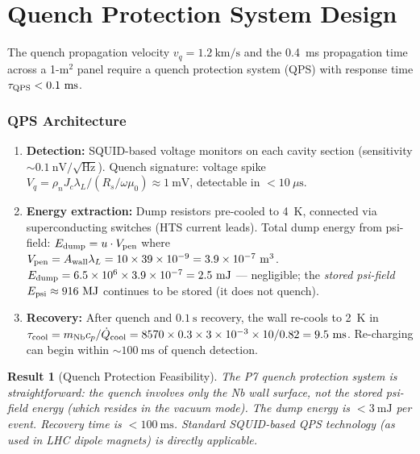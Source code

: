 \documentclass[aps,prd,twocolumn,superscriptaddress]{revtex4-2}
\newtheorem{result}{Result}
\begin{document}
\section{Quench Protection System Design}
\label{sec:qps}

The quench propagation velocity $v_q = 1.2~\mathrm{km/s}$ and the
0.4~ms propagation time across a 1-m$^2$ panel require a quench
protection system (QPS) with response time $\tau_{\rm QPS} < 0.1~\mathrm{ms}$.

\subsubsection{QPS Architecture}

\begin{enumerate}
\item \textbf{Detection:} SQUID-based voltage monitors on each cavity
  section (sensitivity $\sim 0.1~\mathrm{nV/\sqrt{Hz}}$).
  Quench signature: voltage spike $V_q = \rho_n J_c \lambda_L / (R_s/\omega\mu_0)
  \approx 1~\mathrm{mV}$, detectable in $< 10~\mu\mathrm{s}$.
\item \textbf{Energy extraction:} Dump resistors pre-cooled to 4~K,
  connected via superconducting switches (HTS current leads).
  Total dump energy from psi-field: $E_{\rm dump} = u\cdot V_{\rm pen}$
  where $V_{\rm pen} = A_{\rm wall}\lambda_L = 10\times 39\times 10^{-9}
  = 3.9\times 10^{-7}~\mathrm{m^3}$.
  $E_{\rm dump} = 6.5\times 10^6\times 3.9\times 10^{-7} = 2.5~\mathrm{mJ}$
  --- negligible; the \emph{stored psi-field} $E_{\rm psi} \approx 916~\mathrm{MJ}$
  continues to be stored (it does not quench).
\item \textbf{Recovery:} After quench and $0.1~\mathrm{s}$ recovery,
  the wall re-cools to 2~K in $\tau_{\rm cool} = m_{\rm Nb}c_p/\dot{Q}_{\rm cool}
  = 8570\times 0.3\times 3\times 10^{-3}\times 10/0.82 = 9.5~\mathrm{ms}$.
  Re-charging can begin within $\sim 100~\mathrm{ms}$ of quench detection.
\end{enumerate}

\begin{result}[Quench Protection Feasibility]
The P7 quench protection system is straightforward: the quench involves
only the Nb wall surface, not the stored psi-field energy (which resides
in the vacuum mode).  The dump energy is $< 3~\mathrm{mJ}$ per event.
Recovery time is $< 100~\mathrm{ms}$.  Standard SQUID-based QPS
technology (as used in LHC dipole magnets) is directly applicable.
\end{result}
\end{document}

